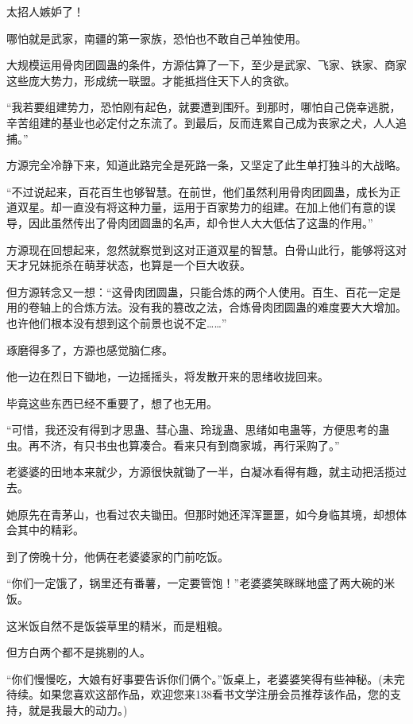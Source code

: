 \begin{this_body}
太招人嫉妒了！

哪怕就是武家，南疆的第一家族，恐怕也不敢自己单独使用。

大规模运用骨肉团圆蛊的条件，方源估算了一下，至少是武家、飞家、铁家、商家这些庞大势力，形成统一联盟。才能抵挡住天下人的贪欲。

“我若要组建势力，恐怕刚有起色，就要遭到围歼。到那时，哪怕自己侥幸逃脱，辛苦组建的基业也必定付之东流了。到最后，反而连累自己成为丧家之犬，人人追捕。”

方源完全冷静下来，知道此路完全是死路一条，又坚定了此生单打独斗的大战略。

“不过说起来，百花百生也够智慧。在前世，他们虽然利用骨肉团圆蛊，成长为正道双星。却一直没有将这种力量，运用于百家势力的组建。在加上他们有意的误导，因此虽然传出了骨肉团圆蛊的名声，却令世人大大低估了这蛊的作用。”

方源现在回想起来，忽然就察觉到这对正道双星的智慧。白骨山此行，能够将这对天才兄妹扼杀在萌芽状态，也算是一个巨大收获。

但方源转念又一想：“这骨肉团圆蛊，只能合炼的两个人使用。百生、百花一定是用的卷轴上的合炼方法。没有我的篡改之法，合炼骨肉团圆蛊的难度要大大增加。也许他们根本没有想到这个前景也说不定……”

琢磨得多了，方源也感觉脑仁疼。

他一边在烈日下锄地，一边摇摇头，将发散开来的思绪收拢回来。

毕竟这些东西已经不重要了，想了也无用。

“可惜，我还没有得到才思蛊、彗心蛊、玲珑蛊、思绪如电蛊等，方便思考的蛊虫。再不济，有只书虫也算凑合。看来只有到商家城，再行采购了。”

老婆婆的田地本来就少，方源很快就锄了一半，白凝冰看得有趣，就主动把活揽过去。

她原先在青茅山，也看过农夫锄田。但那时她还浑浑噩噩，如今身临其境，却想体会其中的精彩。

到了傍晚十分，他俩在老婆婆家的门前吃饭。

“你们一定饿了，锅里还有番薯，一定要管饱！”老婆婆笑眯眯地盛了两大碗的米饭。

这米饭自然不是饭袋草里的精米，而是粗粮。

但方白两个都不是挑剔的人。

“你们慢慢吃，大娘有好事要告诉你们俩个。”饭桌上，老婆婆笑得有些神秘。(未完待续。如果您喜欢这部作品，欢迎您来138看书文学注册会员推荐该作品，您的支持，就是我最大的动力。)

\end{this_body}

